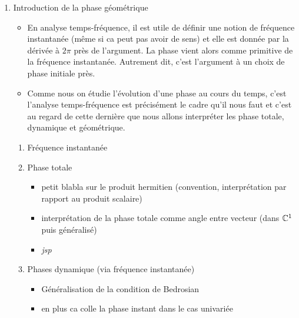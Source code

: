 
\begin{enumerate}[label=\arabic* --- ]\bfseries
	
	\item Introduction de la phase géométrique
	\begin{itemize}\normalfont
		
		\item En analyse temps-fréquence, il est utile de définir une notion de fréquence instantanée (même si ca peut pas avoir de sens) \cite{cohen_time_1995} et elle est donnée par la dérivée à $2\pi$ près de l'argument. La phase vient alors comme primitive de la fréquence instantanée. Autrement dit, c'est l'argument à un choix de phase initiale près.
		
		\item Comme nous on étudie l'évolution d'une phase au cours du temps, c'est l'analyse temps-fréquence est précisément le cadre qu'il nous faut et c'est au regard de cette dernière que nous allons interpréter les phase totale, dynamique et géométrique.
		
	\end{itemize}
	\begin{enumerate}[label=\arabic{enumi}.\arabic* --- ]
		
		\item Fréquence instantanée
		\begin{itemize}
			
		\end{itemize}
		
		\item Phase totale
		\begin{itemize} \normalfont 
			\item petit blabla sur le produit hermitien (convention, interprétation par rapport au produit scalaire)
			
			\item interprétation de la phase totale comme angle entre vecteur (dans $\mathbb{C}^1$ puis généralisé)
			
			\item \textit{jsp}
		\end{itemize}
		
		\item Phases dynamique (via fréquence instantanée)
		\begin{itemize} \normalfont
			
			\item Généralisation de la condition de Bedrosian 
			
			\item en plus ca colle la phase instant dans le cas univariée
			

\end{itemize}
\end{enumerate}
\end{enumerate}
